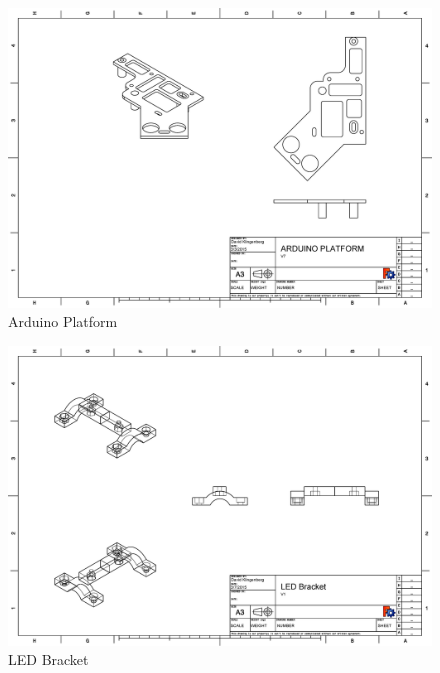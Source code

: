 \documentclass[pdftex,11pt]{article}
\begin{document}
\begin{figure}[!h]
	\centering
		\includegraphics[width=1\textwidth]{./graphics/arduino_platformv7.eps}
	\caption{Arduino Platform}
	\label{fig:arduinoplatform}
\end{figure}

\begin{figure}[!h]
	\centering
		\includegraphics[width=1\textwidth]{./graphics/LED_Bracket.eps}
	\caption{LED Bracket}
	\label{fig:arduinoplatform}
\end{figure}
\end{document}
